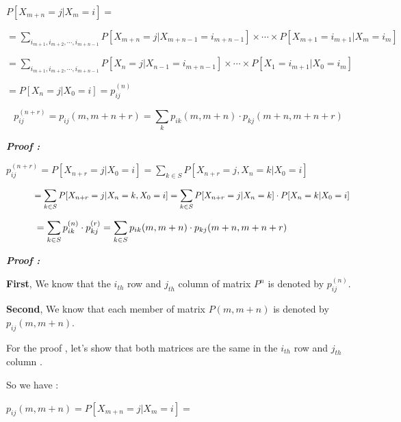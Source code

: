 \documentclass[a4paper]{article}
\begin{document}
		
		$P[X_{m+n} =j | X_{m} = i] =$
		
		$= \displaystyle{\sum_{i_{m+1}, i_{m+2} , \cdots , i_{m+n-1}} P[X_{m+n}=j|X_{m+n-1} = i_{m+n-1}]\times\cdots\times P[X_{m+1} = i_{m+1} | X_{m} = i_m]}$
		
		$= \displaystyle{\sum_{i_{m+1}, i_{m+2} , \cdots , i_{m+n-1}} P[X_{n}=j|X_{n-1} = i_{m+n-1}]\times\cdots\times P[X_{1} = i_{m+1} | X_{0} = i_m]}$
		\bigskip
		
		$= P[X_n = j | X_0 = i] = p^{(n)}_{ij}$
		
		
		 \[p^{(n+r)}_{ij} = p_{ij}(m , m+n+r) = \sum_{k} p_{ik}(m , m+n)\cdot p_{kj}(m+n , m+n+r)\]
		
		\newpage
		\large{\bf \emph{Proof :}}

		$\displaystyle{p^{(n+r)}_{ij} = P[X_{n+r}=j | X_0 = i] = \sum_{k \in S} P[X_{n+r}=j, X_{n}=k | X_0 = i]}$
		
		$\displaystyle{ \hspace{1.1cm}=\sum_{k \in S} P[X_{n+r}=j | X_{n}=k , X_0 = i]= \sum_{k \in S} P[X_{n+r}=j | X_{n}=k]\cdot P[X_{n}=k | X_{0}=i] } $
		
		$\displaystyle{ \hspace{1.1cm}= \sum_{k \in S} p^{(n)}_{ik}\cdot p^{(r)}_{kj} = \sum_{k \in S} p_{ik}(m,m+n) \cdot p_{kj}(m+n,m+n+r) }$
		
		
		
		\large{\bf \emph{Proof :}}
		
		\textbf{First}, We know that the $i_{th}$ row and $j_{th}$ column of matrix $P^{n}$ is denoted by $p^{(n)}_{ij}$. 
		
		\textbf{Second}, We know that each member of matrix $P(m,m+n)$ is denoted by $p_{ij}(m,m+n)$. 
		
		For the proof , let's show that both matrices are the same in the $i_{th}$ row and $j_{th}$ column .
		
		So we have :
		 
		
		$p_{ij}(m,m+n) = P[X_{m+n} =j | X_{m} = i] =$
		
\end{document}

